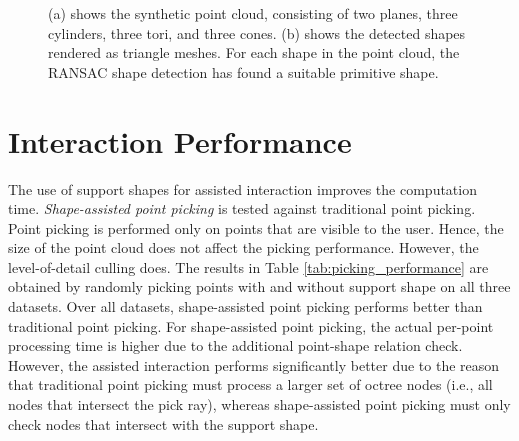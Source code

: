 \begin{figure}[p]
\centering
{}
\caption[Rendering of the synthetic point cloud in (a), rendering of the detected shapes in (b)]
{(a) shows the synthetic point cloud, consisting of two planes, three cylinders, three tori, and three cones. (b) shows the detected shapes rendered as triangle meshes. For each shape in the point cloud, the RANSAC shape detection has found a suitable primitive shape. }
\label{fig:synthetic_point_cloud_results}
\end{figure}


\section{Interaction Performance}
\label{sec:interaction_performance}

The use of support shapes for assisted interaction improves the computation time. \textit{Shape-assisted point picking} is tested against traditional point picking. Point picking is performed only on points that are visible to the user. Hence, the size of the point cloud does not affect the picking performance. However, the level-of-detail culling does. The results in Table \ref{tab:picking_performance} are obtained by randomly picking points with and without support shape on all three datasets. Over all datasets, shape-assisted point picking performs better than traditional point picking. For shape-assisted point picking, the actual per-point processing time is higher due to the additional point-shape relation check. However, the assisted interaction performs significantly better due to the reason that traditional point picking must process a larger set of octree nodes (i.e., all nodes that intersect the pick ray), whereas shape-assisted point picking must only check nodes that intersect with the support shape. 

